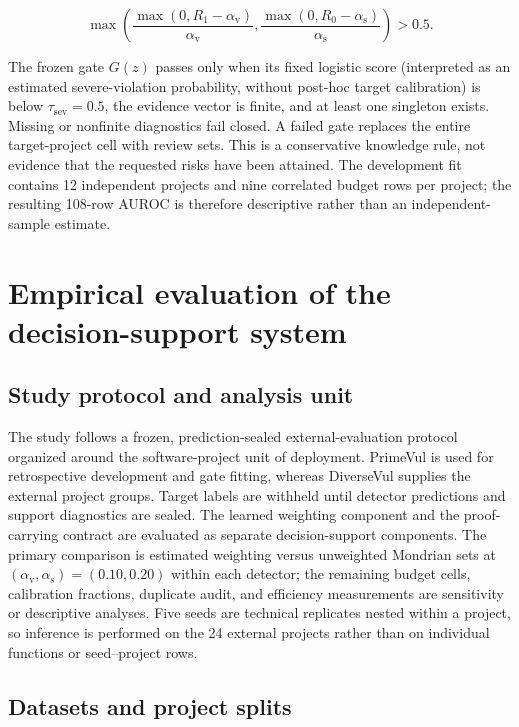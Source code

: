 \documentclass[preprint,12pt]{elsarticle}
\newcommand{\av}{\alpha_{\mathrm{v}}}
\newcommand{\as}{\alpha_{\mathrm{s}}}
\begin{document}
\begin{equation}
 \max\left(\frac{\max(0,R_1-\av)}{\av},\frac{\max(0,R_0-\as)}{\as}\right)>0.5.
\end{equation}

The frozen gate $G(z)$ passes only when its fixed logistic score (interpreted as an estimated severe-violation probability, without post-hoc target calibration) is below $\tau_{\mathrm{sev}}=0.5$, the evidence vector is finite, and at least one singleton exists. Missing or nonfinite diagnostics fail closed. A failed gate replaces the entire target-project cell with review sets. This is a conservative knowledge rule, not evidence that the requested risks have been attained. The development fit contains 12 independent projects and nine correlated budget rows per project; the resulting 108-row AUROC is therefore descriptive rather than an independent-sample estimate.

\section{Empirical evaluation of the decision-support system}

\subsection{Study protocol and analysis unit}

The study follows a frozen, prediction-sealed external-evaluation protocol organized around the software-project unit of deployment. PrimeVul is used for retrospective development and gate fitting, whereas DiverseVul supplies the external project groups. Target labels are withheld until detector predictions and support diagnostics are sealed. The learned weighting component and the proof-carrying contract are evaluated as separate decision-support components. The primary comparison is estimated weighting versus unweighted Mondrian sets at $(\av,\as)=(0.10,0.20)$ within each detector; the remaining budget cells, calibration fractions, duplicate audit, and efficiency measurements are sensitivity or descriptive analyses. Five seeds are technical replicates nested within a project, so inference is performed on the 24 external projects rather than on individual functions or seed--project rows.

\subsection{Datasets and project splits}
\end{document}
